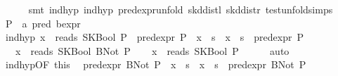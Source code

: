 \begin{isabellebody}
\ \ \ \ \isamarkupfalse%
\ {}smt\ ind{}hyp{}\ ind{}hyp{}\ pred{}expr{}unfold\ skd{}distl\ skd{}distr\ test{}unfold{}simps{}{}{}{}\isanewline
{}\isamarkupfalse%
\isanewline
\ \ \isamarkupfalse%
\ P\ {}{}\ {}{}a\ pred\ bexpr{}\isanewline
\ \ \isamarkupfalse%
\ ind{}hyp{}\ {}x\ {}\ reads\ {}SKBool\ P{}\ {}\ pred{}expr\ P\ {}\ x\ {}{}\ s\ {}\ x\ {}{}\ s\ {}\ pred{}expr\ P{}\isanewline
\ \ \ {}x\ {}\ reads\ {}SKBool\ {}BNot\ P{}{}{}\isanewline
\ \ \isamarkupfalse%
\ {}x\ {}\ reads\ {}SKBool\ P{}{}\isanewline
\ \ \ \ \isamarkupfalse%
\ auto\isanewline
\ \ \isamarkupfalse%
\ ind{}hyp{}OF\ this{}\ \isamarkupfalse%
\ {}pred{}expr\ {}BNot\ P{}\ {}\ x\ {}{}\ s\ {}\ x\ {}{}\ s\ {}\ pred{}expr\ {}BNot\ P{}{}\isanewline

\end{isabellebody}
